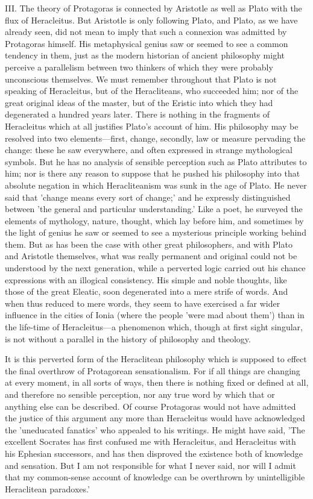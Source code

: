 \documentclass[11pt,letter]{article}
\begin{document}
\par  III. The theory of Protagoras is connected by Aristotle as well as Plato with the flux of Heracleitus. But Aristotle is only following Plato, and Plato, as we have already seen, did not mean to imply that such a connexion was admitted by Protagoras himself. His metaphysical genius saw or seemed to see a common tendency in them, just as the modern historian of ancient philosophy might perceive a parallelism between two thinkers of which they were probably unconscious themselves. We must remember throughout that Plato is not speaking of Heracleitus, but of the Heracliteans, who succeeded him; nor of the great original ideas of the master, but of the Eristic into which they had degenerated a hundred years later. There is nothing in the fragments of Heracleitus which at all justifies Plato's account of him. His philosophy may be resolved into two elements—first, change, secondly, law or measure pervading the change: these he saw everywhere, and often expressed in strange mythological symbols. But he has no analysis of sensible perception such as Plato attributes to him; nor is there any reason to suppose that he pushed his philosophy into that absolute negation in which Heracliteanism was sunk in the age of Plato. He never said that 'change means every sort of change;' and he expressly distinguished between 'the general and particular understanding.' Like a poet, he surveyed the elements of mythology, nature, thought, which lay before him, and sometimes by the light of genius he saw or seemed to see a mysterious principle working behind them. But as has been the case with other great philosophers, and with Plato and Aristotle themselves, what was really permanent and original could not be understood by the next generation, while a perverted logic carried out his chance expressions with an illogical consistency. His simple and noble thoughts, like those of the great Eleatic, soon degenerated into a mere strife of words. And when thus reduced to mere words, they seem to have exercised a far wider influence in the cities of Ionia (where the people 'were mad about them') than in the life-time of Heracleitus—a phenomenon which, though at first sight singular, is not without a parallel in the history of philosophy and theology.

\par  It is this perverted form of the Heraclitean philosophy which is supposed to effect the final overthrow of Protagorean sensationalism. For if all things are changing at every moment, in all sorts of ways, then there is nothing fixed or defined at all, and therefore no sensible perception, nor any true word by which that or anything else can be described. Of course Protagoras would not have admitted the justice of this argument any more than Heracleitus would have acknowledged the 'uneducated fanatics' who appealed to his writings. He might have said, 'The excellent Socrates has first confused me with Heracleitus, and Heracleitus with his Ephesian successors, and has then disproved the existence both of knowledge and sensation. But I am not responsible for what I never said, nor will I admit that my common-sense account of knowledge can be overthrown by unintelligible Heraclitean paradoxes.'
\end{document}
